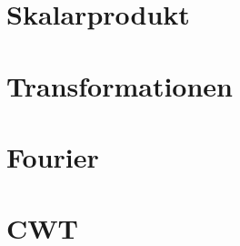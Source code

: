 %
%
%




\section{Skalarprodukt}


\section{Transformationen}


\section{Fourier}


\section{CWT}






